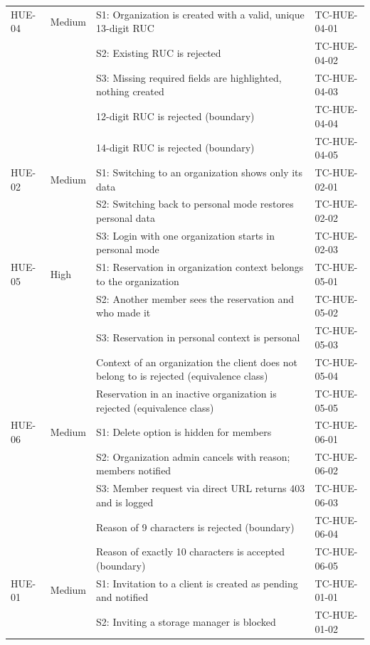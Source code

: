 \begin{longtable}{@{}L{1.5cm}L{1.5cm}L{8.3cm}L{2.7cm}@{}}
  HUE-04 & Medium & S1: Organization is created with a valid, unique 13-digit RUC & TC-HUE-04-01 \\
         &      & S2: Existing RUC is rejected & TC-HUE-04-02 \\
         &      & S3: Missing required fields are highlighted, nothing created & TC-HUE-04-03 \\
         &      & 12-digit RUC is rejected (boundary) & TC-HUE-04-04 \\
         &      & 14-digit RUC is rejected (boundary) & TC-HUE-04-05 \\
  HUE-02 & Medium & S1: Switching to an organization shows only its data & TC-HUE-02-01 \\
         &      & S2: Switching back to personal mode restores personal data & TC-HUE-02-02 \\
         &      & S3: Login with one organization starts in personal mode & TC-HUE-02-03 \\
  HUE-05 & High & S1: Reservation in organization context belongs to the organization & TC-HUE-05-01 \\
         &      & S2: Another member sees the reservation and who made it & TC-HUE-05-02 \\
         &      & S3: Reservation in personal context is personal & TC-HUE-05-03 \\
         &      & Context of an organization the client does not belong to is rejected (equivalence class) & TC-HUE-05-04 \\
         &      & Reservation in an inactive organization is rejected (equivalence class) & TC-HUE-05-05 \\
  HUE-06 & Medium & S1: Delete option is hidden for members & TC-HUE-06-01 \\
         &      & S2: Organization admin cancels with reason; members notified & TC-HUE-06-02 \\
         &      & S3: Member request via direct URL returns 403 and is logged & TC-HUE-06-03 \\
         &      & Reason of 9 characters is rejected (boundary) & TC-HUE-06-04 \\
         &      & Reason of exactly 10 characters is accepted (boundary) & TC-HUE-06-05 \\
  HUE-01 & Medium & S1: Invitation to a client is created as pending and notified & TC-HUE-01-01 \\
         &      & S2: Inviting a storage manager is blocked & TC-HUE-01-02 \\

\end{longtable}
